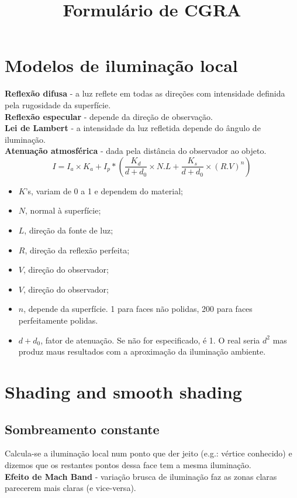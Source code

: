 \documentclass{report}
\begin{document}
\title{Formulário de CGRA}
\maketitle{}

\chapter{Modelos de iluminação local}
\textbf{Reflexão difusa} - a luz reflete em todas as direções com intensidade definida pela rugosidade da superfície.\\
\textbf{Reflexão especular} - depende da direção de observação.\\
\textbf{Lei de Lambert} - a intensidade da luz refletida depende do ângulo de iluminação.\\
\textbf{Atenuação atmosférica} - dada pela distância do observador ao objeto.\\

\begin{equation}
    I = I_a \times K_a + I_p * \left(\frac{K_d}{d + d_0} \times N.L + \frac{K_s}{d + d_0} \times (R.V)^n\right)
\end{equation}

\begin{itemize}
    \itemsep0em 
    \item $K$'s, variam de 0 a 1 e dependem do material;
    \item $N$, normal à superfície;
    \item $L$, direção da fonte de luz;
    \item $R$, direção da reflexão perfeita;
    \item $V$, direção do observador;
    \item $V$, direção do observador;
    \item $n$, depende da superfície. 1 para faces não polidas, 200 para faces perfeitamente polidas.
    \item $d + d_0$, fator de atenuação. Se não for especificado, é 1. O real seria $d^2$ mas produz maus
    resultados com a aproximação da iluminação ambiente.
\end{itemize}

\chapter{Shading and smooth shading}
\section{Sombreamento constante}
Calcula-se a iluminação local num ponto que der jeito (e.g.: vértice conhecido) e dizemos que
os restantes pontos dessa face tem a mesma iluminação.\\
\textbf{Efeito de Mach Band} - variação brusca de iluminação faz as zonas claras parecerem
mais claras (e vice-versa).
\end{document}
